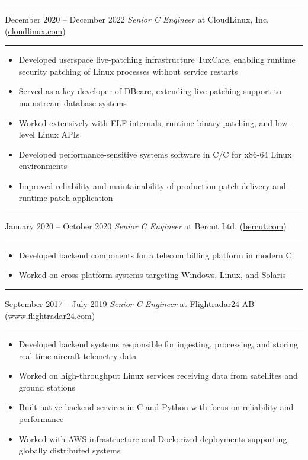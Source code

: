 \documentclass[12pt]{article}
\newcommand\CXX{C\nolinebreak[4]\hspace{-.05em}\raisebox{.4ex}{\relsize{-3}{\textbf{++}}}}
\newcommand\CvSmallSkipLength{0.5em}
\newcommand\CvSkip[1]{\vspace{#1}}
\newcommand\CvSmallSkip{\CvSkip{\CvSmallSkipLength}}
\newcommand\CvRule{\begingroup\color{CvRuleColor}\hrule\endgroup}
\newcommand\CvWorkplaceHeader[5]{\begingroup%
  \CvRule\nopagebreak%
  \fboxsep0pt%
  \colorbox{CvWorkplaceHeaderColor}{%
    \begin{minipage}{\linewidth-2\fboxsep}%
\CvSmallSkip%
#1 -- #2 \hfill \textit{#3} at #4 (\href{http://#5/}{#5})%
\CvSmallSkip%
    \end{minipage}%
  }%
  \CvRule%
\endgroup%
}
\newenvironment{CvWorkplaceDescription}{%
    \begingroup\setlength\parskip{\CvSmallSkipLength}%
  }{%
    \CvSmallSkip\endgroup%
  }
\begin{document}
\CvWorkplaceHeader{December 2020}{December 2022}{Senior {\CXX} Engineer}{CloudLinux, Inc.}{cloudlinux.com}

\begin{CvWorkplaceDescription}
\begin{itemize}[noitemsep]
  \item Developed userspace live-patching infrastructure TuxCare, enabling runtime security patching of Linux processes without service restarts
  \item Served as a key developer of DBcare, extending live-patching support to mainstream database systems
  \item Worked extensively with ELF internals, runtime binary patching, and low-level Linux APIs
  \item Developed performance-sensitive systems software in C/{\CXX} for x86-64 Linux environments
  \item Improved reliability and maintainability of production patch delivery and runtime patch application
\end{itemize}
\end{CvWorkplaceDescription}

\CvWorkplaceHeader{January 2020}{October 2020}{Senior {\CXX} Engineer}{Bercut Ltd.}{bercut.com}

\begin{CvWorkplaceDescription}
\begin{itemize}[noitemsep]
  \item Developed backend components for a telecom billing platform in modern \CXX
  \item Worked on cross-platform systems targeting Windows, Linux, and Solaris
\end{itemize}
\end{CvWorkplaceDescription}

\CvWorkplaceHeader{September 2017}{July 2019}{Senior {\CXX} Engineer}{Flightradar24 AB}{www.flightradar24.com}

\begin{CvWorkplaceDescription}

\begin{itemize}[noitemsep]
  \item Developed backend systems responsible for ingesting, processing, and storing real-time aircraft telemetry data
  \item Worked on high-throughput Linux services receiving data from satellites and ground stations
  \item Built native backend services in {\CXX} and Python with focus on reliability and performance
  \item Worked with AWS infrastructure and Dockerized deployments supporting globally distributed systems
\end{itemize}
\end{CvWorkplaceDescription}
\end{document}
